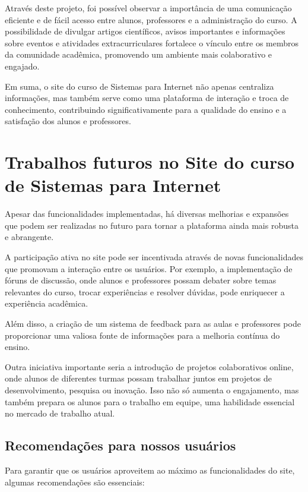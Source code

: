 \documentclass[a4paper,12pt]{report}
\begin{document}
Através deste projeto, foi possível observar a importância de uma comunicação eficiente e de fácil acesso entre alunos, professores e a administração do curso. A possibilidade de divulgar artigos científicos, avisos importantes e informações sobre eventos e atividades extracurriculares fortalece o vínculo entre os membros da comunidade acadêmica, promovendo um ambiente mais colaborativo e engajado. 

Em suma, o site do curso de Sistemas para Internet não apenas centraliza informações, mas também serve como uma plataforma de interação e troca de conhecimento, contribuindo significativamente para a qualidade do ensino e a satisfação dos alunos e professores.

\section{Trabalhos futuros no Site do curso de Sistemas para Internet} 

Apesar das funcionalidades implementadas, há diversas melhorias e expansões que podem ser realizadas no futuro para tornar a plataforma ainda mais robusta e abrangente. 

A participação ativa no site pode ser incentivada através de novas funcionalidades que promovam a interação entre os usuários. Por exemplo, a implementação de fóruns de discussão, onde alunos e professores possam debater sobre temas relevantes do curso, trocar experiências e resolver dúvidas, pode enriquecer a experiência acadêmica.  

Além disso, a criação de um sistema de feedback para as aulas e professores pode proporcionar uma valiosa fonte de informações para a melhoria contínua do ensino. 

Outra iniciativa importante seria a introdução de projetos colaborativos online, onde alunos de diferentes turmas possam trabalhar juntos em projetos de desenvolvimento, pesquisa ou inovação. Isso não só aumenta o engajamento, mas também prepara os alunos para o trabalho em equipe, uma habilidade essencial no mercado de trabalho atual. 

\subsection{Recomendações para nossos usuários} 
Para garantir que os usuários aproveitem ao máximo as funcionalidades do site, algumas recomendações são essenciais: 
\end{document}
